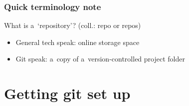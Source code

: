 \documentclass[12pt]{beamer}
\begin{document}
\begin{frame}
  \frametitle{Quick terminology note}

  \begin{block}{What is a~`repository'?}
    {\footnotesize{}(coll.: \alert{repo} or \alert{repos})}
    \begin{itemize}
      \item General tech speak:
        online storage space
      \item Git speak:
        a~copy of a~version-controlled project folder
    \end{itemize}
  \end{block}
\end{frame}

%


\section{Getting git set up}
\end{document}
